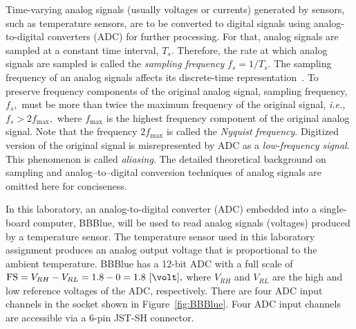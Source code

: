 Time-varying analog signals (usually voltages or currents) generated by sensors, such as temperature sensors, are to be converted to digital signals using analog-to-digital converters (ADC) for further processing. For that, analog signals are sampled at a constant time interval, $T_s.$ Therefore, the rate at which analog signals are sampled is called the \emph{sampling frequency} $f_s=1/T_s.$   The sampling frequency of an analog signals affects its discrete-time representation~\cite[Ch.~10]{Smaili2008}. To preserve frequency components of the original analog signal, sampling frequency, $f_s,$ must be more than twice the maximum frequency of the original signal, \textit{i.e.,~} %
%
  $f_s > 2f_{\text{max}},$ 
%
where $f_{\text{max}}$ is the highest frequency component of the original analog signal. Note that the frequency $2f_{\text{max}}$ is called the \emph{Nyquist frequency}. Digitized version of the original signal is misrepresented by ADC as a \emph{low-frequency signal}. This phenomenon is called \emph{aliasing}.  The detailed theoretical background on sampling and analog--to--digital conversion techniques of analog signals are omitted here for conciseness.   

In this laboratory, an analog-to-digital converter (ADC) embedded into a single-board computer, BBBlue, will be used to read analog signals (voltages) produced by a temperature sensor. The temperature sensor used in this laboratory assignment produces an analog output voltage that is proportional to the ambient temperature. BBBlue has a 12-bit ADC with a full scale of $\text{FS} = V_{RH} - V_{RL} = 1.8-0=1.8~[\volt],$ where $V_{RH}$ and $V_{RL}$ are the high and low reference voltages of the ADC, respectively. There are four ADC input channels in the socket shown in Figure~\ref{fig:BBBlue}. Four ADC input channels  are accessible via a 6-pin JST-SH connector. 
%

